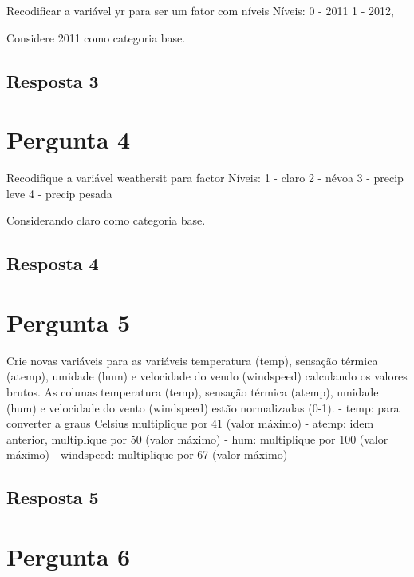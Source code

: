 \documentclass[
]{article}
\begin{document}
Recodificar a variável yr para ser um fator com níveis Níveis: 0 - 2011
1 - 2012,

Considere 2011 como categoria base.

\hypertarget{resposta-3}{%
\subsection{Resposta 3}\label{resposta-3}}

\hypertarget{pergunta-4}{%
\section{Pergunta 4}\label{pergunta-4}}

Recodifique a variável weathersit para factor Níveis: 1 - claro 2 -
névoa 3 - precip leve 4 - precip pesada

Considerando claro como categoria base.

\hypertarget{resposta-4}{%
\subsection{Resposta 4}\label{resposta-4}}

\hypertarget{pergunta-5}{%
\section{Pergunta 5}\label{pergunta-5}}

Crie novas variáveis para as variáveis temperatura (temp), sensação
térmica (atemp), umidade (hum) e velocidade do vendo (windspeed)
calculando os valores brutos. As colunas temperatura (temp), sensação
térmica (atemp), umidade (hum) e velocidade do vento (windspeed) estão
normalizadas (0-1). - temp: para converter a graus Celsius multiplique
por 41 (valor máximo) - atemp: idem anterior, multiplique por 50 (valor
máximo) - hum: multiplique por 100 (valor máximo) - windspeed:
multiplique por 67 (valor máximo)

\hypertarget{resposta-5}{%
\subsection{Resposta 5}\label{resposta-5}}

\hypertarget{pergunta-6}{%
\section{Pergunta 6}\label{pergunta-6}}
\end{document}
